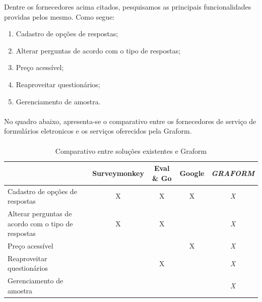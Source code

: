 \documentclass[11pt]{article}
\begin{document}
      Dentre os fornecedores acima citados, pesquisamos as principais funcionalidades providas pelos mesmo. Como segue:

      \begin{enumerate}
        \item Cadastro de opções de respostas;
        \item Alterar perguntas de acordo com o tipo de respostas;
        \item Preço acessível;
        \item Reaproveitar questionários;
        \item Gerenciamento de amostra.
      \end{enumerate}
      
  \newpage

      \paragraph{} \hspace{10pt}
      
      No quadro abaixo, apresenta-se o comparativo entre os fornecedores de serviço de formulários eletronicos e os serviços oferecidos pela Graform.

      \paragraph{} \hspace{10pt}

      \begin{table}[h]
        \begin{center}
          \begin{tabular}{ | p{5cm} | c | c | c | c | }
            \hline
                                                                                & Surveymonkey\cellcolor{gray}  & Eval \& Go\cellcolor{gray} & Google\cellcolor{gray} & \em GRAFORM\cellcolor{gray} \\
            \hline
            Cadastro de opções de respostas\cellcolor{gray}                     & X             & X           & X       & \em X \\
            \hline
            Alterar perguntas de acordo com o tipo de respostas\cellcolor{gray} & X             & X           &         & \em X \\
            \hline
            Preço acessível\cellcolor{gray}                                     &               &             & X       & \em X \\
            \hline
            Reaproveitar questionários\cellcolor{gray}                          &               & X           &         & \em X \\
            \hline
            Gerenciamento de amostra\cellcolor{gray}                            &               &             &         & \em X \\
            \hline
          \end{tabular}
          \caption{Comparativo entre soluções existentes e Graform}
        \end{center}
      \end{table}
      
\end{document}
